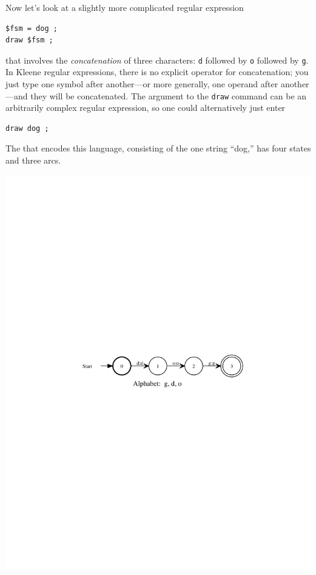 Now let's look at a slightly more complicated regular expression

\begin{Verbatim}
$fsm = dog ;
draw $fsm ;
\end{Verbatim}

\noindent
that involves the \emph{concatenation} of three characters: \texttt{d} followed by
\texttt{o} followed by \texttt{g}.   In Kleene regular expressions, there is no
explicit operator for concatenation; you just type one symbol after another---or
more generally, one operand after another---and they will be concatenated.  
The argument to the \texttt{draw} command can be
an arbitrarily complex regular expression, so one could alternatively just enter

\begin{Verbatim}
draw dog ;
\end{Verbatim}

The \fsm{} that encodes this language, consisting
of the one string ``dog,'' has four states and three arcs.

\begin{center}
\includegraphics{images/dog.pdf}
\end{center}

